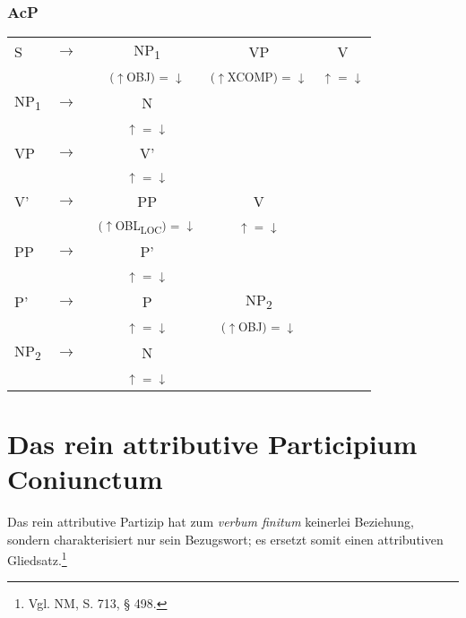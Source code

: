 \documentclass[12pt,a4paper]{article}
\begin{document}
\subsubsection{AcP}



\begin{singlespace}
\renewcommand{\arraystretch}{1}  
\begin{tabular}{ l  l  c  c  c }
  S & $\rightarrow$ & NP\textsubscript{1} & VP & V\\
   & $\qquad$ & \textsuperscript{($\uparrow$OBJ) = $\downarrow$} & \textsuperscript{($\uparrow$XCOMP) = $\downarrow$} & \textsuperscript{$\uparrow$ = $\downarrow$} \\
    NP\textsubscript{1} & $\rightarrow$ & N \\
   & $\qquad$ & \textsuperscript{$\uparrow$ = $\downarrow$} \\
    VP & $\rightarrow$ & V' \\
   & $\qquad$ & \textsuperscript{$\uparrow$ = $\downarrow$} \\
    V' & $\rightarrow$ & PP & V & \\
   & $\qquad$ & \textsuperscript{($\uparrow$OBL\textsubscript{LOC}) = $\downarrow$ } & \textsuperscript{$\uparrow$ = $\downarrow$} \\
    PP & $\rightarrow$ & P' \\
	& $\qquad$   & \textsuperscript{$\uparrow$ = $\downarrow$} \\
    P' & $\rightarrow$ & P & NP\textsubscript{2} \\
   & $\qquad$ & \textsuperscript{$\uparrow$ = $\downarrow$} & \textsuperscript{($\uparrow$OBJ) = $\downarrow$} \\
    NP\textsubscript{2} & $\rightarrow$ & N \\
   & $\qquad$ & \textsuperscript{$\uparrow$ = $\downarrow$} \\
\end{tabular} 
\end{singlespace}
 

\newpage
\section{Das rein attributive Participium Coniunctum}

Das rein attributive Partizip hat zum \textit{verbum finitum} keinerlei Beziehung, sondern charakterisiert nur sein Bezugswort; es ersetzt somit einen attributiven Gliedsatz.\footnote{Vgl. NM, S. 713, § 498.} \\
\end{document}
